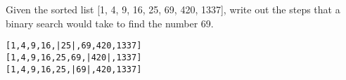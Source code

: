 Given the sorted list [1, 4, 9, 16, 25, 69, 420, 1337], write out the steps that a binary search would take to find the number 69.
\begin{answer}
\begin{lstlisting}
[1,4,9,16,|25|,69,420,1337]
[1,4,9,16,25,69,|420|,1337]
[1,4,9,16,25,|69|,420,1337]
\end{lstlisting}
\end{answer}